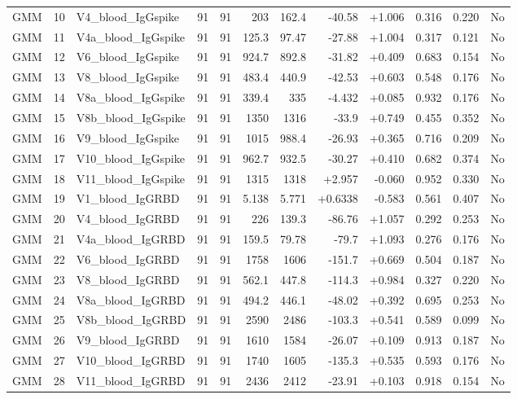 \begin{landscape}
\begin{longtable}{@{}lrp{4.0cm}rrrrrrrrr@{}}
GMM & 10 & V4\_blood\_IgGspike & 91 & 91 & 203 & 162.4 & -40.58 & +1.006 & 0.316 & 0.220 & No \\
GMM & 11 & V4a\_blood\_IgGspike & 91 & 91 & 125.3 & 97.47 & -27.88 & +1.004 & 0.317 & 0.121 & No \\
GMM & 12 & V6\_blood\_IgGspike & 91 & 91 & 924.7 & 892.8 & -31.82 & +0.409 & 0.683 & 0.154 & No \\
GMM & 13 & V8\_blood\_IgGspike & 91 & 91 & 483.4 & 440.9 & -42.53 & +0.603 & 0.548 & 0.176 & No \\
GMM & 14 & V8a\_blood\_IgGspike & 91 & 91 & 339.4 & 335 & -4.432 & +0.085 & 0.932 & 0.176 & No \\
GMM & 15 & V8b\_blood\_IgGspike & 91 & 91 & 1350 & 1316 & -33.9 & +0.749 & 0.455 & 0.352 & No \\
GMM & 16 & V9\_blood\_IgGspike & 91 & 91 & 1015 & 988.4 & -26.93 & +0.365 & 0.716 & 0.209 & No \\
GMM & 17 & V10\_blood\_IgGspike & 91 & 91 & 962.7 & 932.5 & -30.27 & +0.410 & 0.682 & 0.374 & No \\
GMM & 18 & V11\_blood\_IgGspike & 91 & 91 & 1315 & 1318 & +2.957 & -0.060 & 0.952 & 0.330 & No \\
GMM & 19 & V1\_blood\_IgGRBD & 91 & 91 & 5.138 & 5.771 & +0.6338 & -0.583 & 0.561 & 0.407 & No \\
GMM & 20 & V4\_blood\_IgGRBD & 91 & 91 & 226 & 139.3 & -86.76 & +1.057 & 0.292 & 0.253 & No \\
GMM & 21 & V4a\_blood\_IgGRBD & 91 & 91 & 159.5 & 79.78 & -79.7 & +1.093 & 0.276 & 0.176 & No \\
GMM & 22 & V6\_blood\_IgGRBD & 91 & 91 & 1758 & 1606 & -151.7 & +0.669 & 0.504 & 0.187 & No \\
GMM & 23 & V8\_blood\_IgGRBD & 91 & 91 & 562.1 & 447.8 & -114.3 & +0.984 & 0.327 & 0.220 & No \\
GMM & 24 & V8a\_blood\_IgGRBD & 91 & 91 & 494.2 & 446.1 & -48.02 & +0.392 & 0.695 & 0.253 & No \\
GMM & 25 & V8b\_blood\_IgGRBD & 91 & 91 & 2590 & 2486 & -103.3 & +0.541 & 0.589 & 0.099 & No \\
GMM & 26 & V9\_blood\_IgGRBD & 91 & 91 & 1610 & 1584 & -26.07 & +0.109 & 0.913 & 0.187 & No \\
GMM & 27 & V10\_blood\_IgGRBD & 91 & 91 & 1740 & 1605 & -135.3 & +0.535 & 0.593 & 0.176 & No \\
GMM & 28 & V11\_blood\_IgGRBD & 91 & 91 & 2436 & 2412 & -23.91 & +0.103 & 0.918 & 0.154 & No \\

\end{longtable}
\end{landscape}
